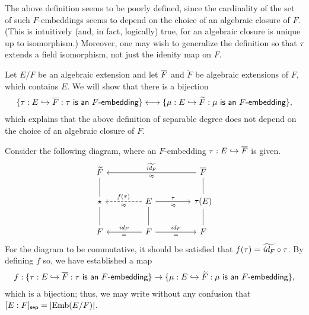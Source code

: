 The above definition seems to be poorly defined, since the cardinality of the set of such $F$-embeddings seems to depend on the choice of an algebraic closure of $F$. (This is intuitively (and, in fact, logically) true, for an algebraic closure is unique up to isomorphism.)
Moreover, one may wish to generalize the definition so that $\tau$ extends a field isomorphism, not just the idenity map on $F$.
\begin{obs}
    Let $E/F$ be an algebraic extension and let $\overline{F}$ and $\widetilde F$ be algebraic extensions of $F$, which contains $E$.
    We will show that there is a bijection
    \begin{align*}
        \{\tau: E\hookrightarrow\overline{F}: \textsf{$\tau$ is an $F$-embedding}\}
        \longleftrightarrow
        \{\mu: E\hookrightarrow\widetilde F: \textsf{$\mu$ is an $F$-embedding}\},
    \end{align*}
    which explains that the above definition of separable degree does not depend on the choice of an algebraic closure of $F$.

    Consider the following diagram, where an $F$-embedding $\tau: E\hookrightarrow\overline{F}$ is given.
    \begin{equation*}
    \begin{tikzcd}[row sep=0.7cm, column sep=1.5cm]
        \widetilde F
        &
        &
        \ol F
            \arrow[ll, "\widetilde{\id{F}}"', "\approx"]
        \\
        \star
            \arrow[u, dash]
        &
        E
            \arrow[l, "f(\tau)"', "\approx", dashed]
            \arrow[r, "\tau", "\approx"']
        &
        \tau(E)
            \arrow[u, dash]
        \\
        F
            \arrow[u, dash]
        &
        F
            \arrow[l, "\id{F}"', "="]
            \arrow[u, dash]
            \arrow[r, "\id{F}", "="']
        &
        F
            \arrow[u, dash]
    \end{tikzcd}
    \end{equation*}
    For the diagram to be commutative, it should be satisfied that $f(\tau)=\widetilde{\textit{id}_{F}}\circ\tau$.
    By defining $f$ so, we have established a map
    \begin{align*}
        f:
        \{\tau: E\hookrightarrow\overline{F}: \textsf{$\tau$ is an $F$-embedding}\}
        \rightarrow
        \{\mu: E\hookrightarrow\widetilde F: \textsf{$\mu$ is an $F$-embedding}\},
    \end{align*}
    \color{brown}which is a bijection\color{black}; thus, we may write without any confusion that $[E: F]_{\textsf{sep}}=|{\textrm{Emb}({E/F})}|$.
\end{obs}
